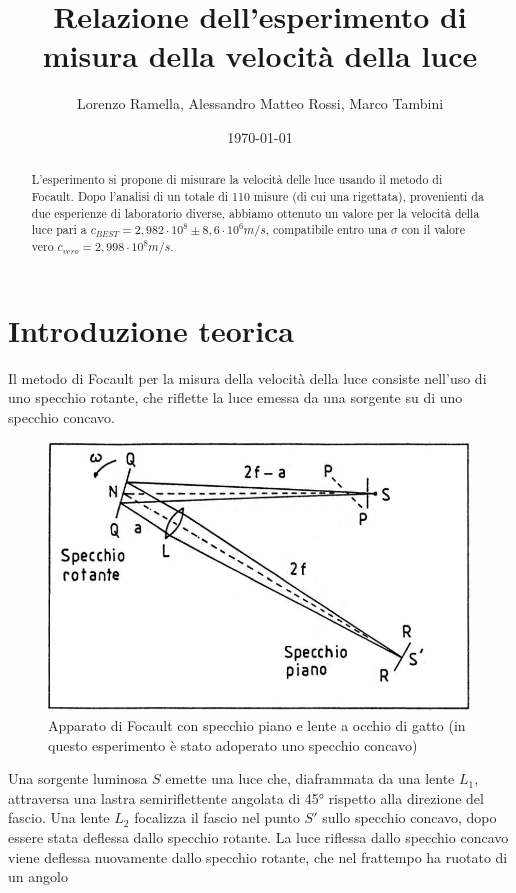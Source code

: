 \documentclass{article}
\title{Relazione dell'esperimento di misura della velocità della luce}
\author{Lorenzo Ramella, Alessandro Matteo Rossi, Marco Tambini}
\date{\today}
\begin{document}
\maketitle

\begingroup
{}
\begin{abstract}
    \centering
L’esperimento si propone di misurare la velocità delle luce usando il metodo di Focault. Dopo l'analisi di un totale di 110 misure (di cui una rigettata), provenienti 
da due esperienze di laboratorio diverse, abbiamo ottenuto un valore per la velocità della luce pari a $c_{BEST}=2,982\cdot10^8 \pm 8,6\cdot 10^6 m/s$, compatibile
entro una $\sigma$ con il valore vero $c_{vero}=2,998\cdot10^8 m/s$.
\end{abstract}
\endgroup


\tableofcontents
\newpage


\section{Introduzione teorica}
Il metodo di Focault per la misura della velocità della luce consiste nell'uso di uno specchio rotante, che riflette la luce emessa da una sorgente su di uno specchio 
concavo. 

\begin{figure}[h!]
    \centering
    \includegraphics[width=0.5\linewidth]{App_Focault.JPG}
    \captionsetup{justification=centering,margin=0cm}
    \caption{Apparato di Focault con specchio piano e lente a occhio di gatto (in questo esperimento è stato adoperato uno specchio concavo)}
    \label{App_Focault}
\end{figure}

Una sorgente luminosa $S$ emette una luce che, diaframmata da una lente $L_1$, attraversa una lastra semiriflettente angolata di 45° rispetto alla 
direzione del fascio. Una lente $L_2$ focalizza il fascio nel punto $S'$ sullo specchio concavo, dopo essere stata deflessa dallo specchio rotante. La luce riflessa 
dallo specchio concavo viene deflessa nuovamente dallo specchio rotante, che nel frattempo ha ruotato di un angolo 
\end{document}
